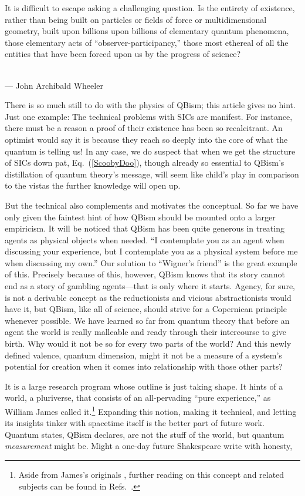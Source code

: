 \begin{flushright}
\baselineskip=13pt
\parbox{2.8in}{\baselineskip=13pt\small
It is difficult to escape asking a challenging question. Is the
entirety of existence, rather than being built on particles or fields
of force or multidimensional geometry, built upon billions upon
billions of elementary quantum phenomena, those elementary acts of
``observer-participancy,'' those most ethereal of all the entities
that have been forced upon us by the progress of science?}
\medskip\\
\small --- John Archibald Wheeler
\end{flushright}

There is so much still to do with the physics of QBism; this article gives no hint.  Just one example:  The technical problems with SICs are manifest.  For instance, there must be a reason a proof of their existence has been so recalcitrant.  An optimist would say it is because they reach so deeply into the core of what the quantum is telling us!  In any case, we do suspect that when we get the structure of SICs down pat, Eq.~(\ref{ScoobyDoo}), though already so essential to QBism's distillation of quantum theory's message, will seem like child's play in comparison to the vistas the further knowledge will open up.

But the technical also complements and motivates the conceptual.  So far we have only given the faintest hint of how QBism should be mounted onto a larger empiricism.  It will be noticed that QBism has been quite generous in treating agents as physical objects when needed.  ``I contemplate you as an agent when discussing your experience, but I contemplate you as a physical system before me when discussing my own.''  Our solution to ``Wigner's friend'' is the great example of this.  Precisely because of this, however, QBism knows that its story cannot end as a story of gambling agents---that is only where it starts.  Agency, for sure, is not a derivable concept as the reductionists and vicious abstractionists would have it, but QBism, like all of science, should strive for a Copernican principle whenever possible.  We have learned so far from quantum theory that before an agent the world is really malleable and ready through their intercourse to give birth.  Why would it not be so for every two parts of the world?  And this newly defined valence, quantum dimension, might it not be a measure of a system's potential for creation when it comes into relationship with those other parts?

It is a large research program whose outline is just taking shape.  It hints of a world, a pluriverse, that consists of an all-pervading ``pure experience,'' as William James called it.\footnote{Aside from James's originals \cite{James96a,James96b}, further reading on this concept and related subjects can be found in Refs.~\cite{Lamberth99,Taylor96,Wild69,Gieser05,Russell08,Banks03,Heidelberger04}.}  Expanding this notion, making it technical, and letting its insights tinker with spacetime itself is the better part of future work.  Quantum states, QBism declares, are not the stuff of the world, but quantum {\it measurement\/} might be.  Might a one-day future Shakespeare write with honesty,

